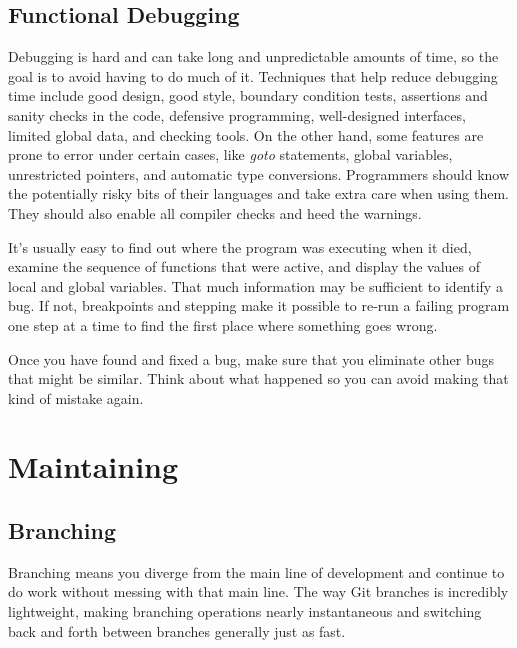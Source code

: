 \documentclass[draftclsnofoot,journal,onecolumn,12pt]{IEEEtran}
\begin{document}
\subsection{Functional Debugging}

Debugging is hard and can take long and unpredictable amounts of time, so the goal is to avoid having to do much of it. Techniques that help reduce debugging time include good design, good style, boundary condition tests, assertions and sanity checks in the code, defensive programming, well-designed interfaces, limited global data, and checking tools. On the other hand, some features are prone to error under certain cases, like \textit{goto} statements, global variables, unrestricted pointers, and automatic type conversions. Programmers should know the potentially risky bits of their languages and take extra care when using them. They should also enable all compiler checks and heed the warnings.

It's usually easy to find out where the program was executing when it died, examine the sequence of functions that were active, and display the values of local and global variables. That much information may be sufficient to identify a bug. If not, breakpoints and stepping make it possible to re-run a failing program one step at a time to find the first place where something goes wrong.

Once you have found and fixed a bug, make sure that you eliminate other bugs that might be similar. Think about what happened so you can avoid making that kind of mistake again.

\section{Maintaining}


\subsection{Branching}
Branching means you diverge from the main line of development and continue to do work without messing with that main line. The way Git branches is incredibly lightweight, making branching operations nearly instantaneous and switching back and forth between branches generally just as fast.
\end{document}
